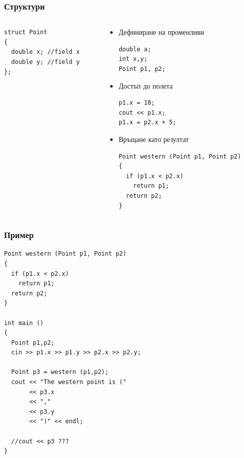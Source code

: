 \documentclass{beamer}
\begin{document}
\begin{frame}[fragile]
\frametitle{Структури}


\begin{columns}[t]
  \begin{column}{0.3\textwidth}
\begin{lstlisting}
struct Point
{
  double x; //field x
  double y; //field y
};
\end{lstlisting}

  \end{column}
  \begin{column}{0.7\textwidth}

\begin{itemize}
\item Дефиниране на променливи
\begin{flushleft}
\begin{lstlisting}
double a;
int x,y;
Point p1, p2;
\end{lstlisting}
\end{flushleft}

\item Достъп до полета
\begin{flushleft}
\begin{lstlisting}
p1.x = 10;
cout << p1.x;
p1.x = p2.x + 5;
\end{lstlisting}
\end{flushleft}


\item Връщане като резултат
\begin{flushleft}
\begin{lstlisting}
Point western (Point p1, Point p2)
{
  if (p1.x < p2.x)
    return p1;
  return p2;
}
\end{lstlisting}
\end{flushleft}


\end{itemize}


  \end{column}
\end{columns}



\end{frame}



\begin{frame}[fragile]
\frametitle{Пример}

\begin{lstlisting}
Point western (Point p1, Point p2)
{
  if (p1.x < p2.x)
    return p1;
  return p2;
}

int main ()
{
  Point p1,p2;
  cin >> p1.x >> p1.y >> p2.x >> p2.y;

  Point p3 = western (p1,p2);
  cout << "The western point is ("
       << p3.x
       << ","
       << p3.y
       << ")" << endl;

  //cout << p3 ???
}

\end{lstlisting}

\end{frame}
\end{document}
